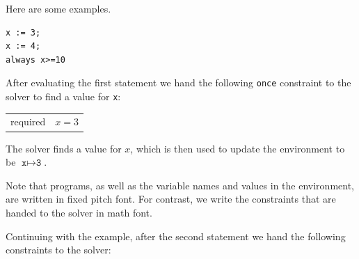 \documentclass{article}
\begin{document}
Here are some examples.

\begin{verbatim}
x := 3;
x := 4;
always x>=10
\end{verbatim}


After evaluating the first statement we hand the following \verb|once|
constraint to the solver to find a value for \texttt{x}:

\begin{tabular}{rl}
required & $x=3$
\end{tabular}

The solver finds a value for $x$, which is then used to update the
environment to be $\texttt{x} \mapsto \texttt{3}$.

Note that programs, as well as the variable names and values in the
environment, are written in fixed pitch font.  For contrast, we write
the constraints that are handed to the solver in math font.

Continuing with the example, after the second statement we hand the
following constraints to the solver:
\end{document}
